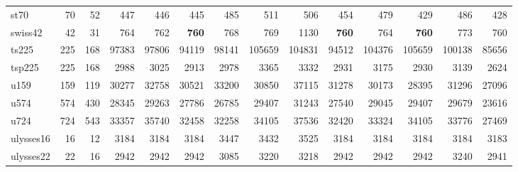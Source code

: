 {\begin{longtable}{l r r r r r r r r r r r r r}
st70 & 70 & 52 & 447 & 446 & 445 & 485 & 511 & 506 & 454 & 479 & 429 & 486 & 428 \\
swiss42 & 42 & 31 & 764 & 762 & \textbf{760} & 768 & 769 & 1130 & \textbf{760} & 764 & \textbf{760} & 773 & 760 \\
ts225 & 225 & 168 & 97383 & 97806 & 94119 & 98141 & 105659 & 104831 & 94512 & 104376 & 105659 & 100138 & 85656 \\
tsp225 & 225 & 168 & 2988 & 3025 & 2913 & 2978 & 3365 & 3332 & 2931 & 3175 & 2930 & 3139 & 2624 \\
u159 & 159 & 119 & 30277 & 32758 & 30521 & 33200 & 30850 & 37115 & 31278 & 30173 & 28395 & 31296 & 27096 \\
u574 & 574 & 430 & 28345 & 29263 & 27786 & 26785 & 29407 & 31243 & 27540 & 29045 & 29407 & 29679 & 23616 \\
u724 & 724 & 543 & 33357 & 35740 & 32458 & 32258 & 34105 & 37536 & 32420 & 33324 & 34105 & 33776 & 27469 \\
ulysses16 & 16 & 12 & 3184 & 3184 & 3184 & 3447 & 3432 & 3525 & 3184 & 3184 & 3184 & 3184 & 3183 \\
ulysses22 & 22 & 16 & 2942 & 2942 & 2942 & 3085 & 3220 & 3218 & 2942 & 2942 & 2942 & 3240 & 2941 \\
\end{longtable}}